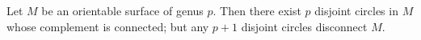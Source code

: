 Let $M$ be an orientable surface of genus $p$. Then there exist $p$ disjoint circles in $M$ whose complement is connected; but any $p + 1$ disjoint circles disconnect $M$.
